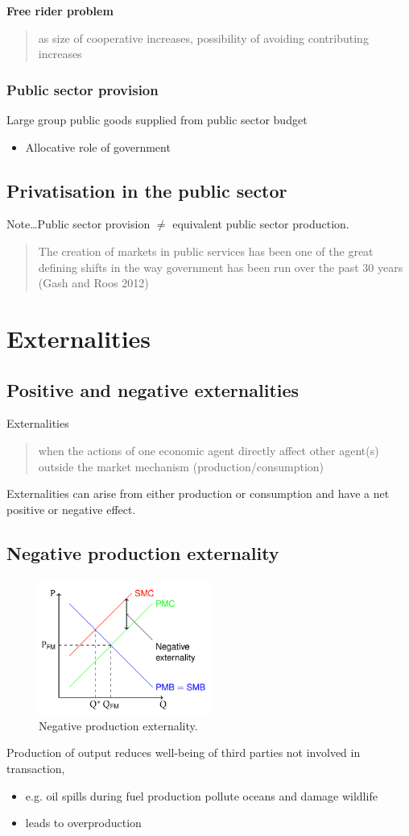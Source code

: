 \textbf{Free rider problem}
\begin{quote}
  as size of cooperative increases, possibility of avoiding contributing increases
\end{quote}
\subsubsection{Public sector provision}
Large group public goods supplied from public sector budget
\begin{itemize}
  \item Allocative role of government
\end{itemize}
\subsection{Privatisation in the public sector}
Note\dots Public sector provision $\neq$ equivalent public sector production.
\begin{quote}
  The creation of markets in public services has been one of the great defining shifts in the way government has been run over the past 30 years (Gash and Roos 2012)
\end{quote}
\section{Externalities}
\subsection{Positive and negative externalities}
Externalities
\begin{quote}
  when the actions of one economic agent directly affect other agent(s) outside the market mechanism (production/consumption)
\end{quote}
Externalities can arise from either production or consumption and have a net positive or negative effect.
\subsection{Negative production externality}
\begin{figure}[H]
  \centering
  \includegraphics[width = 0.5\textwidth]{./img/figure16.png}
  \caption{Negative production externality.}
\end{figure}
Production of output reduces well-being of third parties not involved in transaction,
\begin{itemize}
  \item e.g. oil spills during fuel production pollute oceans and damage wildlife
  \item leads to overproduction
\end{itemize}
